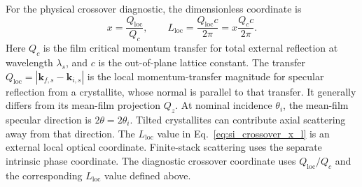 For the physical crossover diagnostic, the dimensionless coordinate is
\begin{equation}
  x=\frac{Q_{\mathrm{loc}}}{Q_c},
  \qquad
  L_{\mathrm{loc}}=\frac{Q_{\mathrm{loc}} c}{2\pi}=x\frac{Q_c c}{2\pi}.
  \label{eq:si_crossover_x_l}
\end{equation}
Here $Q_c$ is the film critical momentum transfer for total external reflection at wavelength $\lambda_s$, and $c$ is the out-of-plane lattice
constant. The transfer $Q_{\mathrm{loc}}=|\mathbf k_{f,s}-\mathbf k_{i,s}|$ is the local momentum-transfer magnitude for specular reflection from a crystallite, whose normal is parallel to that transfer. It generally differs from its mean-film projection $Q_z$. At nominal incidence $\theta_i$, the mean-film specular direction is $2\theta=2\theta_i$. Tilted crystallites can contribute axial scattering away from that direction. The $L_{\mathrm{loc}}$ value in Eq.~\eqref{eq:si_crossover_x_l} is an external local optical coordinate. Finite-stack scattering uses the separate intrinsic phase coordinate. The diagnostic crossover coordinate uses $Q_{\mathrm{loc}}/Q_c$ and the
corresponding $L_{\mathrm{loc}}$ value defined above.

